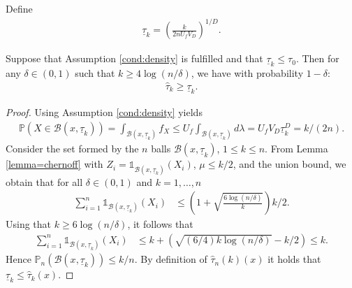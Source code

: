 Define
\begin{align*}
\underline \tau_{k} = \left (\frac{   k  }{ 2n U_f V_D}  \right)^{1/ D}.
\end{align*}

\begin{proposition}\label{prop:tau2}
Suppose that Assumption \ref{cond:density} is fulfilled and that $\underline \tau_{k}  \leq \tau_0$. Then for any $\delta \in (0,1)$ such that  $ k\geq 4   \log(n/\delta)   $, we have with probability $1-\delta$:
\begin{align*}
 \hat \tau_k  \geq \underline \tau_{k}  .
\end{align*}
\end{proposition}

\begin{proof}
 Using Assumption \ref{cond:density} yields
\begin{align*}
\mathbb P (X\in \mathcal{B} (x, \underline \tau_{k}  ) )  =   \int_{\mathcal{B} (x, \underline  \tau_{k}  )} f_X  \leq U_f \int _{\mathcal{B} (x, \underline  \tau_{k}  ) } d\lambda = U_fV_{D}  \underline  \tau_{k} ^{D}  = k/(2n).
\end{align*}
Consider the set formed by the $n$ balls $ \mathcal{B} (x, \underline  \tau_{k} ) $, $  1\leq k\leq n $. From Lemma \ref{lemma=chernoff} with $Z_i = \mathds 1 _{ \mathcal{B} (x, \underline  \tau_{k}  )} (X_i )$, $\mu \leq k/2$, and the union bound, we obtain that for all $\delta\in (0,1)$ and $k= 1,\ldots, n$
\begin{align*}
\sum_{i=1} ^n \mathds 1 _{ \mathcal{B} (x,  \underline  \tau_{k}  ) } (X_i ) &\leq \left(1+ \sqrt{ \frac{6 \log(n/\delta)  }{ k} } \right) k/2  .
\end{align*}
Using that $ k\geq 6   \log(n/\delta)  $, it follows that
\begin{align*}
\sum_{i=1} ^n \mathds 1 _{ \mathcal{B} (x,  \underline  \tau_{k}  ) } (X_i ) & \leq k +  (  \sqrt{ (6/4) k  \log(n/\delta)} - k/2)\leq k.
\end{align*}
Hence $ \mathbb P_n ( \mathcal{B} (x, \underline  \tau_{k}  ) ) \leq k / n $. By definition of $\hat \tau _{n}(k)(x)$ it holds that  $\underline  \tau _{k}  \leq     \hat \tau _{k} (x)$.
\end{proof}

